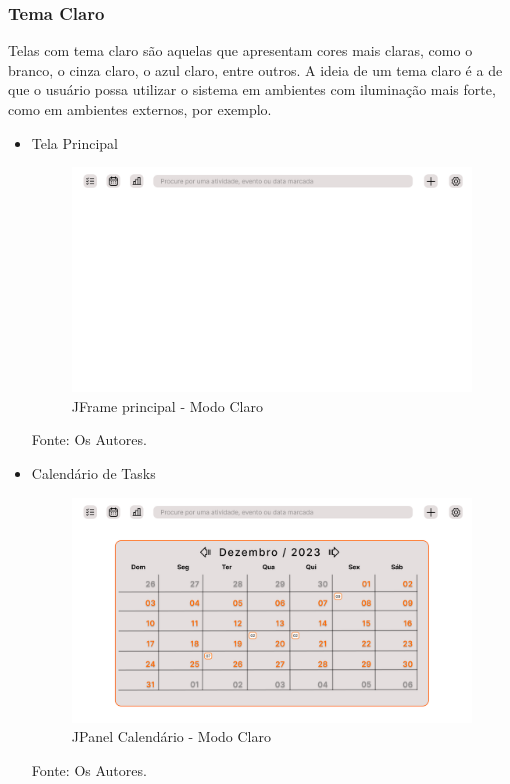 \documentclass[a4paper,12pt]{article}
\begin{document}
\subsubsection{Tema Claro}
Telas com tema claro são aquelas que apresentam cores mais claras, como o branco, o cinza claro, o azul claro, entre outros. 
A ideia de um tema claro é a de que o usuário possa utilizar o sistema em ambientes com iluminação mais forte, como em ambientes 
externos, por exemplo.
\pagebreak
\begin{itemize}
	\item Tela Principal
	\begin{figure}[H]
		\centering
		\includegraphics[scale=0.20]{prototypes/white/Main Window.png}
		\caption{JFrame principal - Modo Claro}
	\end{figure}
	\noindent Fonte: Os Autores.

	\item Calendário de Tasks
	\begin{figure}[H]
		\centering
		\includegraphics[scale=0.20]{prototypes/white/Calendar Panel Window.png}
		\caption{JPanel Calendário - Modo Claro}
	\end{figure}	
	\noindent Fonte: Os Autores.


\end{itemize}
\end{document}
